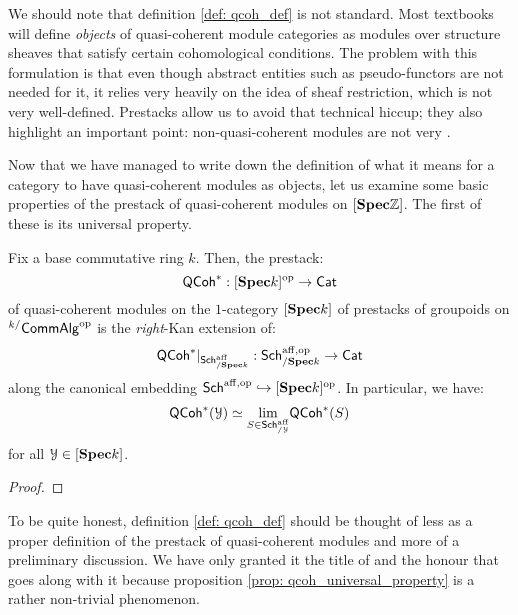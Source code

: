                 \begin{remark}
                    We should note that definition \ref{def: qcoh_def} is not standard. Most textbooks will define \textit{objects} of quasi-coherent module categories as modules over structure sheaves that satisfy certain cohomological conditions. The problem with this formulation is that even though abstract entities such as pseudo-functors are not needed for it, it relies very heavily on the idea of sheaf restriction, which is not very well-defined. Prestacks allow us to avoid that technical hiccup; they also highlight an important point: non-quasi-coherent modules are not very .
                \end{remark}
                
                Now that we have managed to write down the definition of what it means for a category to have quasi-coherent modules as objects, let us examine some basic properties of the prestack of quasi-coherent modules on $[\mathbf{Spec} \mathbb{Z}]$. The first of these is its universal property.
                \begin{proposition} \label{prop: qcoh_universal_property}
                    Fix a base commutative ring $k$. Then, the prestack:
                        $$\mathsf{QCoh}^*: [\mathbf{Spec} k]^{\mathrm{op}} \to \mathsf{Cat}$$
                    of quasi-coherent modules on the $1$-category $[\mathbf{Spec} k]$ of prestacks of groupoids on ${}^{k/}\mathsf{Comm}\mathsf{Alg}^{\mathrm{op}}$ is the \textit{right}-Kan extension of:
                        $$\mathsf{QCoh}^*|_{\mathsf{Sch}^{\mathrm{aff}}_{/\mathbf{Spec} k}}: \mathsf{Sch}^{\mathrm{aff}, \mathrm{op}}_{/\mathbf{Spec} k} \to \mathsf{Cat}$$
                    along the canonical embedding $\mathsf{Sch}^{\mathrm{aff}, \mathrm{op}} \hookrightarrow [\mathbf{Spec} k]^{\mathrm{op}}$. In particular, we have:
                        $$\mathsf{QCoh}^*(\mathcal{Y}) \simeq \underset{S \in \mathsf{Sch}^{\mathrm{aff}}_{/\mathcal{Y}}}{\operatorname{lim}} \mathsf{QCoh}^*(S)$$
                    for all $\mathcal{Y} \in [\mathbf{Spec} k]$.
                \end{proposition}
                    \begin{proof}
                        
                    \end{proof}
                \begin{remark}
                    To be quite honest, definition \ref{def: qcoh_def} should be thought of less as a proper definition of the prestack of quasi-coherent modules and more of a preliminary discussion. We have only granted it the title of  and the honour that goes along with it because proposition \ref{prop: qcoh_universal_property} is a rather non-trivial phenomenon. 
                \end{remark}
    
